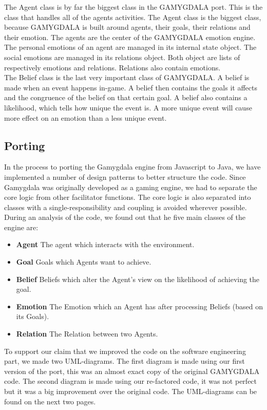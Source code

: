 The Agent class is by far the biggest class in the GAMYGDALA port. This is the class that handles all of the agents activities. The Agent class is the biggest class, because GAMYGDALA is built around agents, their goals, their relations and their emotion. The agents are the center of the GAMYGDALA emotion engine. The personal emotions of an agent are managed in its internal state object. The social emotions are managed in its relations object. Both object are lists of respectively emotions and relations. Relations also contain emotions. \\

The Belief class is the last very important class of GAMYGDALA. A belief is made when an event happens in-game. A belief then contains the goals it affects and the congruence of the belief on that certain goal. A belief also contains a likelihood, which tells how unique the event is. A more unique event will cause more effect on an emotion than a less unique event.

\subsection{Porting}
In the process to porting the Gamygdala engine from Javascript to Java, we have implemented a number of design patterns to better structure the code. Since Gamygdala was originally developed as a gaming engine, we had to separate the core logic from other facilitator functions. The core logic is also separated into classes with a single-responsibility and coupling is avoided wherever possible. \\

During an analysis of the code, we found out that he five main classes of the engine are:
\begin{itemize}
	\item \textbf{Agent} The agent which interacts with the environment.
	\item \textbf{Goal} Goals which Agents want to achieve.
	\item \textbf{Belief} Beliefs which alter the Agent's view on the likelihood of achieving the goal.
	\item \textbf{Emotion} The Emotion which an Agent has after processing Beliefs (based on its Goals).
	\item \textbf{Relation} The Relation between two Agents.
\end{itemize}

To support our claim that we improved the code on the software engineering part, we made two UML-diagrams. The first diagram is made using our first version of the port, this was an almost exact copy of the original GAMYGDALA code. The second diagram is made using our re-factored code, it was not perfect but it was a big improvement over the original code. The UML-diagrams can be found on the next two pages.\\

